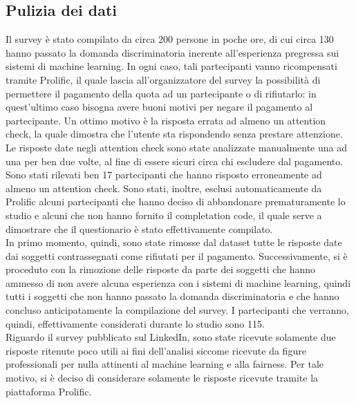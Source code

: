 \subsection{Pulizia dei dati}
Il survey è stato compilato da circa 200 persone in poche ore, di cui circa 130 hanno passato la domanda discriminatoria inerente all'esperienza pregressa sui sistemi di machine learning. In ogni caso, tali partecipanti vanno ricompensati tramite Prolific, il quale lascia all'organizzatore del survey la possibilità di permettere il pagamento della quota ad un partecipante o di rifiutarlo: in quest'ultimo caso bisogna avere buoni motivi per negare il pagamento al partecipante. Un ottimo motivo è la risposta errata ad almeno un attention check, la quale dimostra che l'utente sta rispondendo senza prestare attenzione.\\
Le risposte date negli attention check sono state analizzate manualmente una ad una per ben due volte, al fine di essere sicuri circa chi escludere dal pagamento. Sono stati rilevati ben 17 partecipanti che hanno risposto erroneamente ad almeno un attention check. Sono stati, inoltre, esclusi automaticamente da Prolific alcuni partecipanti che hanno deciso di abbandonare prematuramente lo studio e alcuni che non hanno fornito il completation code, il quale serve a dimostrare che il questionario è stato effettivamente compilato.\\
In primo momento, quindi, sono state rimosse dal dataset tutte le risposte date dai soggetti contrassegnati come rifiutati per il pagamento. Successivamente, si è proceduto con la rimozione delle risposte da parte dei soggetti che hanno ammesso di non avere alcuna esperienza con i sistemi di machine learning, quindi tutti i soggetti che non hanno passato la domanda discriminatoria e che hanno concluso anticipatamente la compilazione del survey. I partecipanti che verranno, quindi, effettivamente considerati durante lo studio sono 115.\\
Riguardo il survey pubblicato sul LinkedIn, sono state ricevute solamente due risposte ritenute poco utili ai fini dell'analisi siccome ricevute da figure professionali per nulla attinenti al machine learning e alla fairness. Per tale motivo, si è deciso di considerare solamente le risposte ricevute tramite la piattaforma Prolific.
